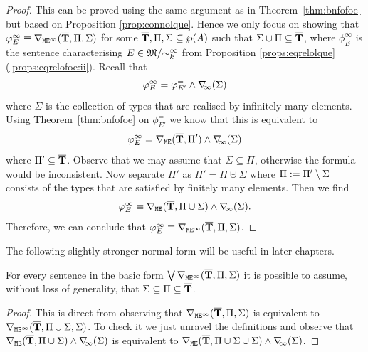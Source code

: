 \begin{proof}
This can be proved using the same argument as in Theorem~\ref{thm:bnfofoe} but
based on Proposition \ref{prop:connolque}. 
Hence we only focus on showing that $\varphi_E^\infty \equiv 
\nabla_{\mathtt{M}\mathtt{E}^{\infty}}(\overline{{\mathbf{T}}},\Pi,\Sigma)$ for some 
$\overline{{\mathbf{T}}},\Pi,\Sigma \subseteq \wp(A)$ such that $\Sigma \cup \Pi \subseteq
\overline{{\mathbf{T}}}$, where $\phi_E^\infty$ is the sentence characterising
$E \in \mathfrak{M}/{\sim^\infty_k}$ from 
Proposition \ref{props:eqrelolque}(\ref{props:eqrelofoe:ii}). 
Recall that
\[
\varphi^\infty_E = \varphi^=_{E'} \land \nabla_{\!\!\infty}(\Sigma)
\]
where $\Sigma$ is the collection of types that are realised by infinitely many 
elements.
Using Theorem~\ref{thm:bnfofoe} on $\phi^=_{E'}$ we know that this is 
equivalent to
\[
\varphi^\infty_E = \nabla_{\mathtt{M}\mathtt{E}}(\overline{{\mathbf{T}}},\Pi') \land \nabla_{\!\!\infty}(\Sigma)
\]
where $\Pi' \subseteq \overline{{\mathbf{T}}}$.
Observe that we may assume that $\Sigma \subseteq \Pi$, otherwise the formula 
would be inconsistent.
Now separate $\Pi'$ as $\Pi' = \Pi \uplus \Sigma$ where $\Pi \mathrel{:=} 
\Pi'\setminus\Sigma$ consists of the types that are satisfied by finitely many 
elements.
Then we find 
\[
\varphi^\infty_E \equiv 
\nabla_{\mathtt{M}\mathtt{E}}(\overline{{\mathbf{T}}},\Pi\cup\Sigma) \land \nabla_{\!\!\infty}(\Sigma).
\]
Therefore, we can conclude that $\varphi^\infty_E \equiv 
\nabla_{\mathtt{M}\mathtt{E}^{\infty}}(\overline{{\mathbf{T}}},\Pi,\Sigma)$.
\end{proof}

\noindent
The following slightly stronger normal form will be useful in later 
chapters.

\begin{proposition}\label{prop:bfofoei-sigmapi}
For every sentence in the basic form $\bigvee \nabla_{\mathtt{M}\mathtt{E}^{\infty}}(\overline{{\mathbf{T}}},\Pi,\Sigma)$
it is possible to assume, without loss of generality, that $\Sigma \subseteq 
\Pi \subseteq \overline{{\mathbf{T}}}$.
\end{proposition}
\begin{proof}
This is direct from observing that $\nabla_{\mathtt{M}\mathtt{E}^{\infty}}(\overline{{\mathbf{T}}},\Pi,\Sigma)$ is 
equivalent to $\nabla_{\mathtt{M}\mathtt{E}^{\infty}}(\overline{{\mathbf{T}}},\Pi\cup\Sigma,\Sigma)$. 
To check it we just unravel the definitions and observe that
$\nabla_{\mathtt{M}\mathtt{E}}(\overline{{\mathbf{T}}},\Pi \cup \Sigma) \land \nabla_{\!\!\infty}(\Sigma)$ is equivalent to
$\nabla_{\mathtt{M}\mathtt{E}}(\overline{{\mathbf{T}}},\Pi \cup \Sigma \cup \Sigma) \land \nabla_{\!\!\infty}(\Sigma)$.
\end{proof}
